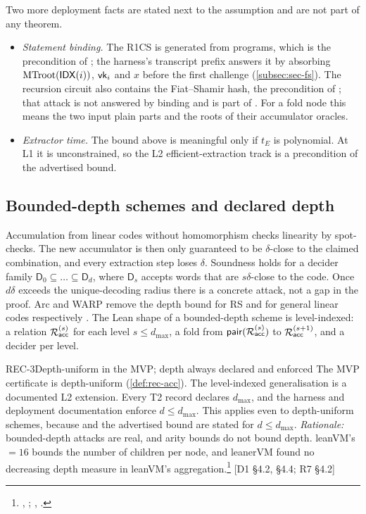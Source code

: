 Two more deployment facts are stated next to the assumption and are not part of any theorem.
\begin{itemize}[nosep]
\item \emph{Statement binding.} The R1CS is generated from programs, which is the precondition of
  \cite{Fen26-GenR1CS}; the harness's transcript prefix answers it by absorbing
  $\mathrm{MTroot}(\mathsf{IDX}(i))$, $\mathsf{vk}_i$ and $x$ before the first challenge
  (\cref{subsec:sec-fs}). The recursion circuit also contains the Fiat--Shamir hash, the
  precondition of \cite{KRS25}; that attack is not answered by binding and is part of
  . For a fold node this means the two input plain parts and the roots of
  their accumulator oracles.
\item \emph{Extractor time.} The bound above is meaningful only if $t_E$ is polynomial. At L1 it is
  unconstrained, so the L2 efficient-extraction track is a precondition of the advertised bound.
\end{itemize}

\subsection{Bounded-depth schemes and declared depth}\label{subsec:rec-depth}

Accumulation from linear codes without homomorphism \cite{BMNW24} checks linearity by spot-checks.
The new accumulator is then only guaranteed to be $\delta$-close to the claimed combination, and
every extraction step loses $\delta$. Soundness holds for a decider family
$\mathsf{D}_0\subseteq\dots\subseteq\mathsf{D}_d$, where $\mathsf{D}_s$ accepts words that are
$s\delta$-close to the code. Once $d\delta$ exceeds the unique-decoding radius there is a concrete
attack, not a gap in the proof. Arc and WARP remove the depth bound for RS and for general linear
codes respectively \cite{BMNW25-Arc,BCFW25-WARP}. The Lean shape of a bounded-depth scheme is
level-indexed: a relation $\mathcal{R}_{\mathsf{acc}}^{(s)}$ for each level $s\le d_{\max}$, a fold from
$\mathsf{pair}(\mathcal{R}_{\mathsf{acc}}^{(s)})$ to $\mathcal{R}_{\mathsf{acc}}^{(s+1)}$, and a decider per level.

\begin{decision}{REC-3}{Depth-uniform in the MVP; depth always declared and enforced}
The MVP certificate is depth-uniform (\cref{def:rec-acc}). The level-indexed generalisation is a
documented L2 extension. Every T2 record declares $d_{\max}$, and the harness and deployment
documentation enforce $d\le d_{\max}$. This applies even to depth-uniform schemes, because
 and the advertised bound are stated for $d\le d_{\max}$. \emph{Rationale:}
bounded-depth attacks are real, and arity bounds do not bound depth. leanVM's
$=16$ bounds the number of children per node, and leanerVM found no decreasing
depth measure in leanVM's aggregation.\footnote{,
; ,
.} [D1 §4.2, §4.4; R7 §4.2]
\end{decision}

